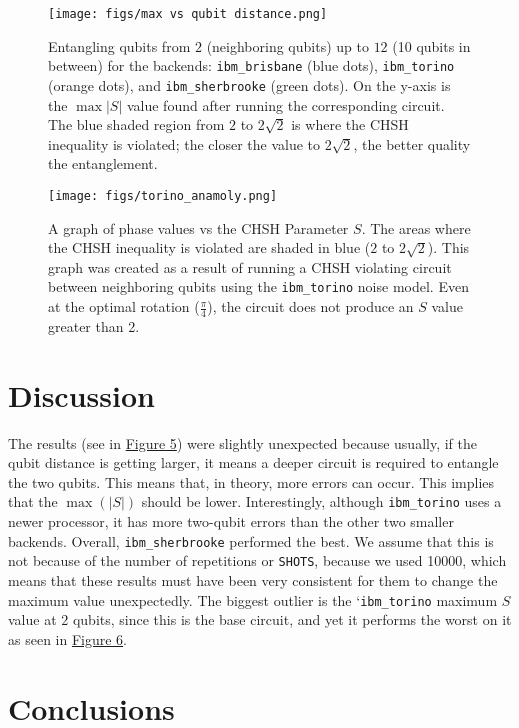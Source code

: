 \documentclass{article}
\begin{document}
\begin{figure}
    \centering
    \texttt{[image: figs/max vs qubit distance.png]}
    \caption{Entangling qubits from $2$ (neighboring qubits) up to $12$ (10 qubits in between) for the backends: \texttt{ibm\_brisbane} (blue dots), \texttt{ibm\_torino} (orange dots), and \texttt{ibm\_sherbrooke} (green dots). On the y-axis is the $\max|S|$ value found after running the corresponding circuit. The blue shaded region from $2$ to $2\sqrt{2}$ is where the CHSH inequality is violated; the closer the value to $2\sqrt{2}$, the better quality the entanglement.}
    \label{fig:all}
\end{figure}

\begin{figure}
    \centering
    \texttt{[image: figs/torino\_anamoly.png]}
    \caption{A graph of phase values vs the CHSH Parameter $S$. The areas where the CHSH inequality is violated are shaded in blue ($2$ to $2\sqrt{2}$). This graph was created as a result of running a CHSH violating circuit between neighboring qubits using the \texttt{ibm\_torino} noise model. Even at the optimal rotation ($\frac{\pi}{4}$), the circuit does not produce an $S$ value greater than 2.}
    \label{fig:torino}
\end{figure}

\section{Discussion}
The results (see in \hyperref[fig:all]{Figure 5}) were slightly unexpected because usually, if the qubit distance is getting larger, it means a deeper circuit is required to entangle the two qubits. This means that, in theory, more errors can occur. This implies that the $\max(|S|)$ should be lower. Interestingly, although \verb|ibm_torino| uses a newer processor, it has more two-qubit errors than the other two smaller backends. Overall, \verb|ibm_sherbrooke| performed the best. We assume that this is not because of the number of repetitions or \verb|SHOTS|, because we used 10000, which means that these results must have been very consistent for them to change the maximum value unexpectedly. The biggest outlier is the `\verb|ibm_torino| maximum $S$ value at $2$ qubits, since this is the base circuit, and yet it performs the worst on it as seen in \hyperref[fig:torino]{Figure 6}.

\section{Conclusions}
\end{document}
